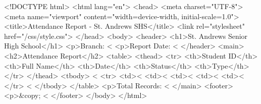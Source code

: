 <!DOCTYPE html>
<html lang="en">
<head>
  <meta charset="UTF-8">
  <meta name="viewport" content="width=device-width, initial-scale=1.0">
  <title>Attendance Report - St. Andrews SHS</title>
  <link rel="stylesheet" href="/css/style.css">
</head>
<body>
  <header>
    <h1>St. Andrews Senior High School</h1>
    <p>Branch: <%
    <p>Report Date: <%
  </header>
  <main>
    <h2>Attendance Report</h2>
    <table>
      <thead>
        <tr>
          <th>Student ID</th>
          <th>Full Name</th>
          <th>Date</th>
          <th>Status</th>
          <th>Type</th>
        </tr>
      </thead>
      <tbody>
        <%
          <tr>
            <td><%
            <td><%
            <td><%
            <td><%
            <td><%
          </tr>
        <%
      </tbody>
    </table>
    <p>Total Records: <%
  </main>
  <footer>
    <p>&copy; <%
  </footer>
</body>
</html>